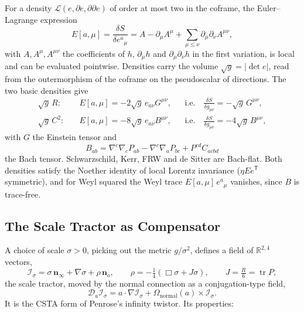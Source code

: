 \documentclass[11pt,a4paper]{article}
\newcommand{\R}{\mathbb{R}}
\newcommand{\D}{\mathcal{D}}
\newcommand{\Om}{\Omega}
\newcommand{\nzero}{\mathbf{n}_o}
\newcommand{\ninf}{\mathbf{n}_\infty}
\newcommand{\cross}{\mathbin{\times}}
\begin{document}
For a density \(\mathcal L(e,\partial e,\partial\partial e)\) of
order at most two in the coframe, the Euler--Lagrange expression
\[
    E[a,\mu]=\frac{\delta S}{\delta e^a{}_\mu}
    =A-\partial_\mu A^\mu+\sum_{\mu\le\nu}\partial_\mu\partial_\nu
    A^{\mu\nu},
\]
with \(A,A^\mu,A^{\mu\nu}\) the coefficients of \(h\), \(\partial_\mu
h\) and \(\partial_\mu\partial_\nu h\) in the first variation, is
local and can be evaluated pointwise. Densities carry the volume
\(\sqrt{g}=|\det e|\), read from the outermorphism of the coframe on
the pseudoscalar of directions. The two basic densities give
\begin{align*}
    \sqrt g\,R:&\quad
    E[a,\mu]=-2\sqrt g\,e_{a\nu}G^{\mu\nu},
    &&\text{i.e.}\quad
    \frac{\delta S}{\delta g_{\mu\nu}}=-\sqrt g\,G^{\mu\nu},\\
    \sqrt g\,C^2:&\quad
    E[a,\mu]=-8\sqrt g\,e_{a\nu}B^{\mu\nu},
    &&\text{i.e.}\quad
    \frac{\delta S}{\delta g_{\mu\nu}}=-4\sqrt g\,B^{\mu\nu},
\end{align*}
with \(G\) the Einstein tensor and
\[
    B_{ab}=\nabla^c\nabla_cP_{ab}-\nabla^c\nabla_aP_{bc}
    +P^{cd}C_{acbd}
\]
the Bach tensor. Schwarzschild,
Kerr, FRW and de Sitter are Bach-flat. Both densities satisfy the
Noether identity of local Lorentz invariance
(\(\eta E e^{\mathsf T}\) symmetric), and for Weyl squared the Weyl
trace \(E[a,\mu]\,e^a{}_\mu\) vanishes, since \(B\) is trace-free.

\subsection{The Scale Tractor as Compensator}

A choice of scale \(\sigma>0\), picking out the metric \(g/\sigma^2\),
defines a field of \(\R^{2,4}\) vectors,
\[
    \boxed{
        \mathcal{I}_\sigma=\sigma\,\ninf+\nabla\sigma+\rho\,\nzero,
        \qquad
        \rho=-\tfrac14\left(\Box\sigma+J\sigma\right),
        \qquad
        J=\tfrac{R}{6}=\operatorname{tr}P,
    }
\]
the scale tractor, moved by the normal connection as a
conjugation-type field,
\[
    \D_a\mathcal I_\sigma=a\cdot\nabla\mathcal I_\sigma
    +\Om_{\mathrm{normal}}(a)\cross\mathcal I_\sigma .
\]
It is the CSTA form of Penrose's infinity twistor. Its properties:
\end{document}
